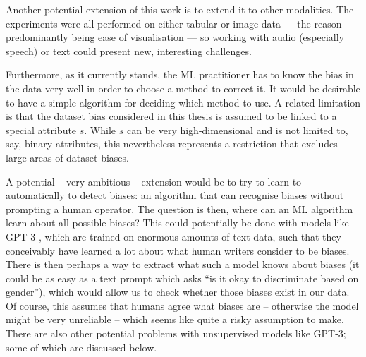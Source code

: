 Another potential extension of this work is to extend it to other modalities.
The experiments were all performed on either tabular or image data
--- the reason predominantly being ease of visualisation ---
so working with audio (especially speech) or text could present new, interesting challenges.

Furthermore, as it currently stands,
the \ac{ML} practitioner has to know the bias in the data very well in order to choose a method to correct it.
It would be desirable to have a simple algorithm for deciding which method to use.
A related limitation is that the dataset bias considered in this thesis
is assumed to be linked to a special attribute \(s\).
While \(s\) can be very high-dimensional and is not limited to, say, binary attributes,
this nevertheless represents a restriction
that excludes large areas of dataset biases.

A potential -- very ambitious -- extension would be
to try to learn to automatically to detect biases:
\ie an algorithm that can recognise biases without prompting a human operator.
The question is then, where can an \ac{ML} algorithm learn about all possible biases?
This could potentially be done with models like GPT-3 \citep{brown2020language},
which are trained on enormous amounts of text data,
such that they conceivably have learned a lot about what human writers consider to be biases.
There is then perhaps a way to extract what such a model knows about biases
(it could be as easy as a text prompt which asks ``is it okay to discriminate based on gender''),
which would allow us to check whether those biases exist in our data.
Of course, this assumes that humans agree what biases are --
otherwise the model might be very unreliable --
which seems like quite a risky assumption to make.
There are also other potential problems with unsupervised models like GPT-3;
some of which are discussed below.

